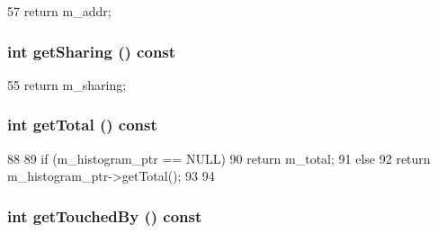 \begin{DoxyCode}
57 { return m_addr; }
\end{DoxyCode}
\hypertarget{classAccessTraceForAddress_a7cf842218272765ebb03269975968026}{
\subsubsection[{getSharing}]{\setlength{\rightskip}{0pt plus 5cm}int getSharing () const}}
\label{classAccessTraceForAddress_a7cf842218272765ebb03269975968026}



\begin{DoxyCode}
55 { return m_sharing; }
\end{DoxyCode}
\hypertarget{classAccessTraceForAddress_af262952019c2e5f874224855cf7fb8bd}{
\subsubsection[{getTotal}]{\setlength{\rightskip}{0pt plus 5cm}int getTotal () const}}
\label{classAccessTraceForAddress_af262952019c2e5f874224855cf7fb8bd}



\begin{DoxyCode}
88 {
89     if (m_histogram_ptr == NULL) {
90         return m_total;
91     } else {
92         return m_histogram_ptr->getTotal();
93     }
94 }
\end{DoxyCode}
\hypertarget{classAccessTraceForAddress_a85c70aea5e7b3ab23bd505f66e16cbef}{
\subsubsection[{getTouchedBy}]{\setlength{\rightskip}{0pt plus 5cm}int getTouchedBy () const}}
\label{classAccessTraceForAddress_a85c70aea5e7b3ab23bd505f66e16cbef}



